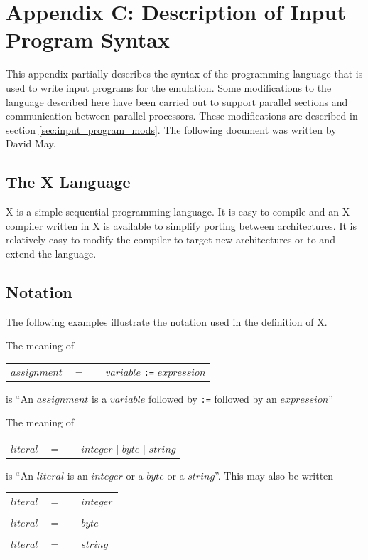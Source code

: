 \documentclass[a4paper, 12pt]{article}
\begin{document}
\newpage
\section*{Appendix C: Description of Input Program Syntax}

This appendix partially describes the syntax of the programming language that is used to write input programs for the emulation. Some modifications to the language described here have been carried out to support parallel sections and communication between parallel processors. These modifications are described in section \ref{sec:input_program_mods}. The following document was written by David May.

\subsection*{The X Language}

X is a simple sequential programming language. It is easy to compile
and an X compiler written in X is available to simplify porting between
architectures.  It is relatively easy to modify the compiler to target 
new architectures or to and extend the language. 

\subsection*{Notation}

The following examples illustrate the notation used in the definition of X. 

The meaning of 

\begin{tabular}{llll}
$assignment$    & $=$ &&$variable$ \verb|:=| $expression$ 
\end{tabular}   

is ``An $assignment$ is a $variable$ followed by \verb|:=| followed by an $expression$'' 

The meaning of

\begin{tabular}{llll}                   
$literal$    & $=$ &&$integer$ $|$ $byte$ $|$ $string$
\end{tabular}                    

is ``An $literal$ is an $integer$ or a $byte$ or a $string$''. This may also be written 

\begin{tabular}{llll}                   
$literal$    & $=$ &&$integer$\\
\\
$literal$    & $=$ &&$byte$\\
\\
$literal$    & $=$ &&$string$
\end{tabular}                    
\end{document}
